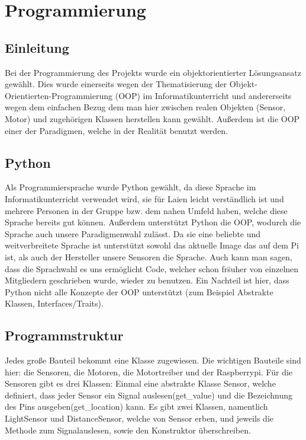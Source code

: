 \documentclass[notitlepage]{report}
\begin{document}
\section{Programmierung}

\subsection{Einleitung}
Bei der Programmierung des Projekts wurde ein objektorientierter L\"{o}sungsansatz gew\"{a}hlt. Dies wurde einerseits wegen der Thematisierung der Objekt-Orientierten-Programmierung (OOP) im Informatikunterricht und andererseits wegen dem einfachen Bezug dem man hier zwischen realen Objekten (Sensor, Motor) und zugeh\"{o}rigen Klassen herstellen kann gewählt. Au{\ss}erdem ist die OOP einer der Paradigmen, welche in der Realit\"{a}t benutzt werden. 

\subsection{Python}
Als Programmiersprache wurde Python gew\"{a}hlt, da  diese Sprache im Informatikunterricht verwendet wird, sie f\"{u}r Laien leicht verst\"{a}ndlich ist und mehrere Personen in der Gruppe bzw. dem nahen Umfeld haben, welche diese Sprache bereits gut k\"{o}nnen. Au{\ss}erdem unterst\"{u}tzt Python die OOP, wodurch die Sprache auch unsere Paradigmenwahl zul\"{a}sst. Da sie eine beliebte und weitverbreitete Sprache ist unterst\"{u}tzt sowohl das aktuelle Image das auf dem Pi ist, als auch der Hersteller unsere Sensoren die Sprache. Auch kann man sagen, dass die Sprachwahl es uns erm\"{o}glicht Code, welcher schon fr\"s{u}her von einzelnen Mitgliedern geschrieben wurde, wieder zu benutzen.  Ein Nachteil ist hier, dass Python nicht alle Konzepte der OOP unterst\"{u}tzt (zum Beispiel Abstrakte Klassen, Interfaces/Traits).

\subsection{Programmstruktur}
Jedes gro{\ss}e Bauteil bekommt eine Klasse zugewiesen. Die wichtigen Bauteile sind hier: die Sensoren, die Motoren, die Motortreiber und der Raspberrypi. F\"{u}r die Sensoren gibt es drei Klassen: Einmal eine abstrakte Klasse Sensor, welche definiert, dass jeder Sensor ein Signal auslesen(get\_value) und die Bezeichnung des Pins ausgeben(get\_location) kann. Es gibt  zwei Klassen, namentlich LightSensor und DistanceSensor, welche von Sensor erben, und jeweils die Methode zum Signalauslesen, sowie den Konstruktor \"{u}berschreiben.
\end{document}
